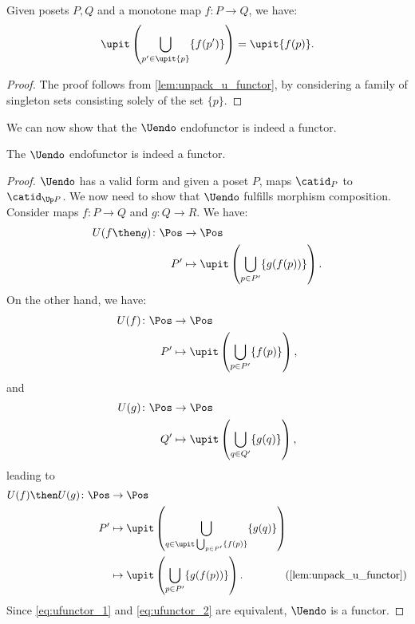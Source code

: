 \begin{lemma}
  \label{lem:unpack_part_2}
  Given posets $P,Q$ and a monotone map $f\colon P\to Q$, we have:
  \begin{equation}
    \upit \left( \bigcup_{p'\in \upit \{p\}} \{f(p')\}\right)=\upit \{f(p)\}.
  \end{equation}
\end{lemma}
\begin{proof}
  The proof follows from \cref{lem:unpack_u_functor}, by considering a family of singleton sets consisting solely of the set $\{p\}$.
\end{proof}
We can now show that the $\Uendo$ endofunctor is indeed a functor.
\begin{lemma}
  The $\Uendo$ endofunctor is indeed a functor.
\end{lemma}
\begin{proof}
  $\Uendo$ has a valid form and given a poset $P$, maps $\catid_P$ to $\catid_{\Up P}$. We now need to show that $\Uendo$ fulfills morphism composition. Consider maps $f\colon P \to Q$ and $g\colon Q \to R$. We have:
  \begin{equation}
    \label{eq:ufunctor_1}
    \begin{aligned}
      U(f\then g)\colon \Pos &\to \Pos\\
      P'&\mapsto \upit \left( \bigcup_{p\in P'} \{g(f(p))\}\right).
    \end{aligned}
  \end{equation}
  On the other hand, we have:
  \begin{equation}
    \begin{aligned}
      U(f)\colon \Pos &\to \Pos\\
      P'&\mapsto \upit \left( \bigcup_{p\in P'}\{f(p)\}\right),
    \end{aligned}
  \end{equation}
  and
  \begin{equation}
    \begin{aligned}
      U(g)\colon \Pos &\to \Pos\\
      Q'&\mapsto \upit \left( \bigcup_{q\in Q'}\{g(q)\}\right),
    \end{aligned}
  \end{equation}
  leading to
  \begin{equation}
    \label{eq:ufunctor_2}
    \begin{aligned}
      U(f)\then U(g)\colon \Pos &\to \Pos\\
      P'&\mapsto \upit\left( \bigcup_{q\in \upit \bigcup_{p\in P'}\{f(p)\}}\{g(q)\}\right)\\
      &\mapsto \upit \left(\bigcup_{p\in P'} \{ g(f(p))\}\right). \qquad \qquad (\cref{lem:unpack_u_functor})
    \end{aligned}
  \end{equation}
  Since \cref{eq:ufunctor_1} and \cref{eq:ufunctor_2} are equivalent, $\Uendo$ is a functor.
\end{proof}

